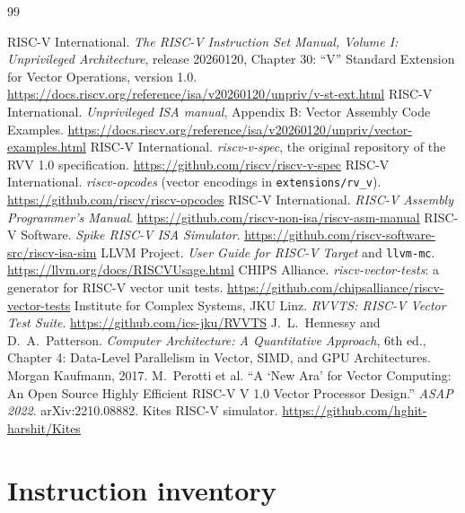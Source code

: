 \documentclass[11pt]{article}
\begin{document}
\begin{thebibliography}{99}\small{}
 RISC-V International. \emph{The RISC-V Instruction Set Manual, Volume I: Unprivileged
  Architecture}, release 20260120, Chapter 30: ``V'' Standard Extension for Vector Operations, version 1.0.
  \url{https://docs.riscv.org/reference/isa/v20260120/unpriv/v-st-ext.html}
 RISC-V International. \emph{Unprivileged ISA manual}, Appendix B: Vector Assembly Code Examples.
  \url{https://docs.riscv.org/reference/isa/v20260120/unpriv/vector-examples.html}
 RISC-V International. \emph{riscv-v-spec}, the original repository of the RVV 1.0 specification.
  \url{https://github.com/riscv/riscv-v-spec}
 RISC-V International. \emph{riscv-opcodes} (vector encodings in \texttt{extensions/rv\_v}).
  \url{https://github.com/riscv/riscv-opcodes}
 RISC-V International. \emph{RISC-V Assembly Programmer's Manual}.
  \url{https://github.com/riscv-non-isa/riscv-asm-manual}
 RISC-V Software. \emph{Spike RISC-V ISA Simulator}.
  \url{https://github.com/riscv-software-src/riscv-isa-sim}
 LLVM Project. \emph{User Guide for RISC-V Target} and \texttt{llvm-mc}.
  \url{https://llvm.org/docs/RISCVUsage.html}
 CHIPS Alliance. \emph{riscv-vector-tests}: a generator for RISC-V vector unit tests.
  \url{https://github.com/chipsalliance/riscv-vector-tests}
 Institute for Complex Systems, JKU Linz. \emph{RVVTS: RISC-V Vector Test Suite}.
  \url{https://github.com/ics-jku/RVVTS}
 J.~L.~Hennessy and D.~A.~Patterson. \emph{Computer Architecture: A Quantitative Approach}, 6th ed.,
  Chapter 4: Data-Level Parallelism in Vector, SIMD, and GPU Architectures. Morgan Kaufmann, 2017.
 M.~Perotti et al. ``A `New Ara' for Vector Computing: An Open Source Highly Efficient
  RISC-V V 1.0 Vector Processor Design.'' \emph{ASAP 2022}. arXiv:2210.08882.
 Kites RISC-V simulator. \url{https://github.com/hghit-harshit/Kites}
\end{thebibliography}

\clearpage
\appendix
\section{Instruction inventory}\label{app:inventory}
\end{document}
